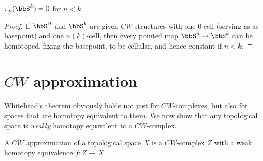 \begin{cor}\label{cor pi_n(S^k)=0}
    $\pi_n(\bbS^k)=0$ for $n<k$.
\end{cor}
\begin{proof}
    If $\bbS^n$ and $\bbS^k$ are given $CW$ structures with one $0$-cell (serving as as basepoint) and one $n(k)$-cell, then every pointed map $\bbS^n\to \bbS^k$ can be homotoped, fixing the basepoint, to be cellular, and hence constant if $n<k$.
\end{proof}





\section{\texorpdfstring{$CW$}{CW} approximation}\label{sec: CW approx}

Whitehead's theorem obviously holds not just for $CW$-complexes, but also for spaces that are homotopy equivalent to them. We now show that any topological space is \emph{weakly} homotopy equivalent to a $CW$-complex.

\begin{defn}[$CW$ approximation]
    A $CW$ approximation of a topological space $X$ is a $CW$-complex $Z$ with a weak homotopy equivalence $f:Z\to X$.
\end{defn}

